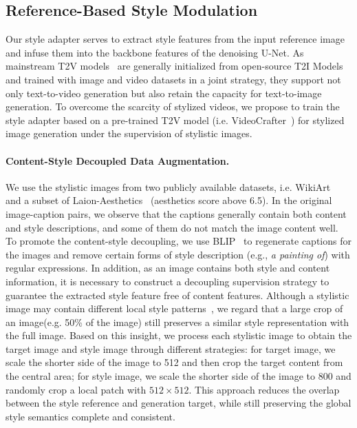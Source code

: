 \vspace{-0.6em}
\subsection{Reference-Based Style Modulation}
\label{subsec:style_modulation}

Our style adapter serves to extract style features from the input reference image and infuse them into the backbone features of the denoising U-Net. As mainstream T2V models~\cite{chen2023videocrafter, chen2024videocrafter2, wang2023modelscope, wang2023lavie} are generally initialized from open-source T2I Models and trained with image and video datasets in a joint strategy, they support not only text-to-video generation but also retain the capacity for text-to-image generation. To overcome the scarcity of stylized videos, we propose to train the style adapter based on a pre-trained T2V model (i.e. VideoCrafter~\cite{chen2023videocrafter}) for stylized image generation under the supervision of stylistic images.

\vspace{-0.3em}
\paragraph{Content-Style Decoupled Data Augmentation.}
\label{sec:data_aug}
We use the stylistic images from two publicly available datasets, i.e. WikiArt~\cite{phillips2011wiki} and a subset of Laion-Aesthetics~\cite{schuhmann2022laion} (aesthetics score above 6.5). In the original image-caption pairs, we observe that the captions generally contain both content and style descriptions, and some of them do not match the image content well. To promote the content-style decoupling, we use BLIP~\cite{li2023blip2} to regenerate captions for the images and remove certain forms of style description (e.g., \textit{a painting of}) with regular expressions.
In addition, as an image contains both style and content information, it is necessary to construct a decoupling supervision strategy to guarantee the extracted style feature free of content features. Although a stylistic image may contain different local style patterns~\cite{park2019arbitrary, huo2021manifold, chen2023tssat}, we regard that a large crop of an image(e.g. 50\% of the image) still preserves a similar style representation with the full image.
Based on this insight, we process each stylistic image to obtain the target image and style image through different strategies: for target image, we scale the shorter side of the image to 512 and then crop the target content from the central area; for style image, we scale the shorter side of the image to 800 and randomly crop a local patch with $512 \times 512$. This approach reduces the overlap between the style reference and generation target, while still preserving the global style semantics complete and consistent.

